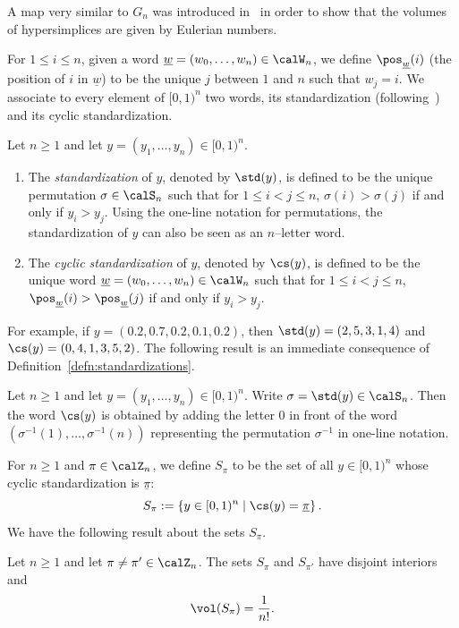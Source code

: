 \begin{rema}
A map very similar to $G_n$ was introduced in~\cite{Sta77} in order to show that the volumes of hypersimplices are given by Eulerian numbers.
\end{rema}

For $1\leq i \leq n$, given a word $\underline{w}=(w_0,\ldots,w_n)\in\calW_n$, we define $\pos_{\underline{w}}(i)$ (the position of $i$ in $\underline{w}$) to be the unique $j$ between $1$ and $n$ such that $w_j=i$. We associate to every element of $[0,1)^n$ two words, its standardization (following~\cite{HJV16}) and its cyclic standardization.

\goodbreak
\begin{defi}\label{defn:standardizations}
Let $n\geq1$ and let $y=(y_1,\ldots,y_n)\in[0,1)^n$.
\begin{enumerate}
\item The \emph{standardization} of $y$, denoted by $\std(y)$, is defined to be the unique permutation $\sigma\in\calS_n$ such that for $1\leq i<j \leq n$, $\sigma(i) > \sigma(j)$ if and only if $y_i > y_j$. Using the one-line notation for permutations, the standardization of $y$ can also be seen as an $n$--letter word.\label{list-defi_4.3.1}
\item The \emph{cyclic standardization} of $y$, denoted by $\cs(y)$, is defined to be the unique word $\underline{w}=(w_0,\ldots,w_n)\in\calW_n$ such that for $1\leq i<j \leq n$, $\pos_{\underline{w}}(i) > \pos_{\underline{w}}(j)$ if and only if $y_i > y_j$.\label{list-defi_4.3.2}
\end{enumerate}
\end{defi}

For example, if $y=(0.2,0.7,0.2,0.1,0.2)$, then $\std(y)=(2,5,3,1,4)$ and $\cs(y)=(0,4,1,3,5,2)$. The following result is an immediate consequence of Definition~\ref{defn:standardizations}.

\begin{lemm}\label{lem:standardization}
Let $n\geq1$ and let $y=(y_1,\ldots,y_n)\in[0,1)^n$. Write $\sigma=\std(y)\in\calS_n$. Then the word $\cs(y)$ is obtained by adding the letter $0$ in front of the word $(\sigma^{-1} (1), \ldots, \sigma^{-1} (n))$ representing the permutation $\sigma^{-1}$ in one-line notation.
\end{lemm}

For $n\geq1$ and $\pi\in\calZ_n$, we define $S_\pi$ to be the set of all $y\in[0,1)^n$ whose cyclic standardization is $\underline{\pi}$:
\[
S_\pi:= \left\{y\in[0,1)^n\;\middle|\;\cs(y)=\underline{\pi} \right\}.
\]
We have the following result about the sets $S_\pi$.
\begin{lemm}\label{lem:simplexvolume}
Let $n\geq1$ and let $\pi\neq \pi' \in \calZ_n$. The sets $S_\pi$ and $S_{\pi'}$ have disjoint interiors and
\[
\vol(S_\pi) = \frac{1}{n!}.
\]
\end{lemm}

